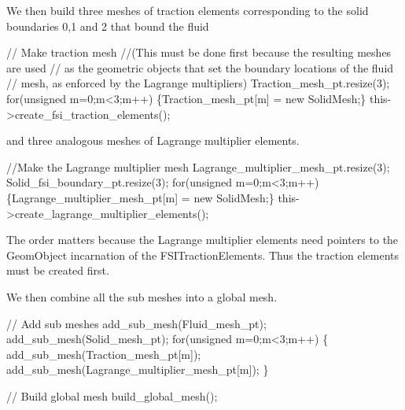 We then build three meshes of traction elements corresponding to the solid boundaries 0,1 and 2 that bound the fluid


\begin{DoxyCodeInclude}
 

 \textcolor{comment}{// Make traction mesh }
 \textcolor{comment}{//(This must be done first because the resulting meshes are used}
 \textcolor{comment}{// as the geometric objects that set the boundary locations of the fluid}
 \textcolor{comment}{// mesh, as enforced by the Lagrange multipliers)}
 Traction\_mesh\_pt.resize(3);
 \textcolor{keywordflow}{for}(\textcolor{keywordtype}{unsigned} m=0;m<3;m++) \{Traction\_mesh\_pt[m] = \textcolor{keyword}{new} SolidMesh;\}
 this->create\_fsi\_traction\_elements();

\end{DoxyCodeInclude}


and three analogous meshes of Lagrange multiplier elements.


\begin{DoxyCodeInclude}
 
 \textcolor{comment}{//Make the Lagrange multiplier mesh}
 Lagrange\_multiplier\_mesh\_pt.resize(3);
 Solid\_fsi\_boundary\_pt.resize(3);
 \textcolor{keywordflow}{for}(\textcolor{keywordtype}{unsigned} m=0;m<3;m++) \{Lagrange\_multiplier\_mesh\_pt[m] = \textcolor{keyword}{new} SolidMesh;\}
 this->create\_lagrange\_multiplier\_elements();

\end{DoxyCodeInclude}


The order matters because the Lagrange multiplier elements need pointers to the {\ttfamily Geom\+Object} incarnation of the {\ttfamily F\+S\+I\+Traction\+Elements}. Thus the traction elements must be created first.

We then combine all the sub meshes into a global mesh.


\begin{DoxyCodeInclude}

 \textcolor{comment}{// Add sub meshes}
 add\_sub\_mesh(Fluid\_mesh\_pt);
 add\_sub\_mesh(Solid\_mesh\_pt);
 \textcolor{keywordflow}{for}(\textcolor{keywordtype}{unsigned} m=0;m<3;m++)
  \{
   add\_sub\_mesh(Traction\_mesh\_pt[m]);
   add\_sub\_mesh(Lagrange\_multiplier\_mesh\_pt[m]);
  \}
 
 \textcolor{comment}{// Build global mesh}
 build\_global\_mesh();

\end{DoxyCodeInclude}


